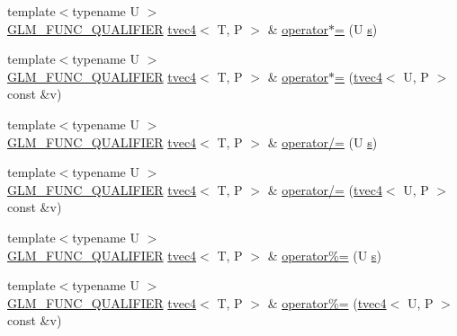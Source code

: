 \begin{DoxyCompactItemize}
\item 
{\footnotesize template$<$typename U $>$ }\\\hyperlink{setup_8hpp_a33fdea6f91c5f834105f7415e2a64407}{G\+L\+M\+\_\+\+F\+U\+N\+C\+\_\+\+Q\+U\+A\+L\+I\+F\+I\+ER} \hyperlink{structglm_1_1detail_1_1tvec4}{tvec4}$<$ T, P $>$ \& \hyperlink{structglm_1_1detail_1_1tvec4_a15fd0b97ca8066f1d1caaf4aa845e917}{operator$\ast$=} (U \hyperlink{structglm_1_1detail_1_1tvec4_a82cbced4cbd070056c5acbc1d4d4906f}{s})
\item 
{\footnotesize template$<$typename U $>$ }\\\hyperlink{setup_8hpp_a33fdea6f91c5f834105f7415e2a64407}{G\+L\+M\+\_\+\+F\+U\+N\+C\+\_\+\+Q\+U\+A\+L\+I\+F\+I\+ER} \hyperlink{structglm_1_1detail_1_1tvec4}{tvec4}$<$ T, P $>$ \& \hyperlink{structglm_1_1detail_1_1tvec4_aec6e3cb70054a84d657c79435b212289}{operator$\ast$=} (\hyperlink{structglm_1_1detail_1_1tvec4}{tvec4}$<$ U, P $>$ const \&v)
\item 
{\footnotesize template$<$typename U $>$ }\\\hyperlink{setup_8hpp_a33fdea6f91c5f834105f7415e2a64407}{G\+L\+M\+\_\+\+F\+U\+N\+C\+\_\+\+Q\+U\+A\+L\+I\+F\+I\+ER} \hyperlink{structglm_1_1detail_1_1tvec4}{tvec4}$<$ T, P $>$ \& \hyperlink{structglm_1_1detail_1_1tvec4_ae55fc4ecd1c6a0dbf09d0026835f58cc}{operator/=} (U \hyperlink{structglm_1_1detail_1_1tvec4_a82cbced4cbd070056c5acbc1d4d4906f}{s})
\item 
{\footnotesize template$<$typename U $>$ }\\\hyperlink{setup_8hpp_a33fdea6f91c5f834105f7415e2a64407}{G\+L\+M\+\_\+\+F\+U\+N\+C\+\_\+\+Q\+U\+A\+L\+I\+F\+I\+ER} \hyperlink{structglm_1_1detail_1_1tvec4}{tvec4}$<$ T, P $>$ \& \hyperlink{structglm_1_1detail_1_1tvec4_a766fdfa0e31c0a0fd31242798ed14250}{operator/=} (\hyperlink{structglm_1_1detail_1_1tvec4}{tvec4}$<$ U, P $>$ const \&v)
\item 
{\footnotesize template$<$typename U $>$ }\\\hyperlink{setup_8hpp_a33fdea6f91c5f834105f7415e2a64407}{G\+L\+M\+\_\+\+F\+U\+N\+C\+\_\+\+Q\+U\+A\+L\+I\+F\+I\+ER} \hyperlink{structglm_1_1detail_1_1tvec4}{tvec4}$<$ T, P $>$ \& \hyperlink{structglm_1_1detail_1_1tvec4_a39fbc616d6315dd06d87f6d9545a2a6c}{operator\%=} (U \hyperlink{structglm_1_1detail_1_1tvec4_a82cbced4cbd070056c5acbc1d4d4906f}{s})
\item 
{\footnotesize template$<$typename U $>$ }\\\hyperlink{setup_8hpp_a33fdea6f91c5f834105f7415e2a64407}{G\+L\+M\+\_\+\+F\+U\+N\+C\+\_\+\+Q\+U\+A\+L\+I\+F\+I\+ER} \hyperlink{structglm_1_1detail_1_1tvec4}{tvec4}$<$ T, P $>$ \& \hyperlink{structglm_1_1detail_1_1tvec4_a2168cec5b85e1dbdd947436d987ecbeb}{operator\%=} (\hyperlink{structglm_1_1detail_1_1tvec4}{tvec4}$<$ U, P $>$ const \&v)

\end{DoxyCompactItemize}
